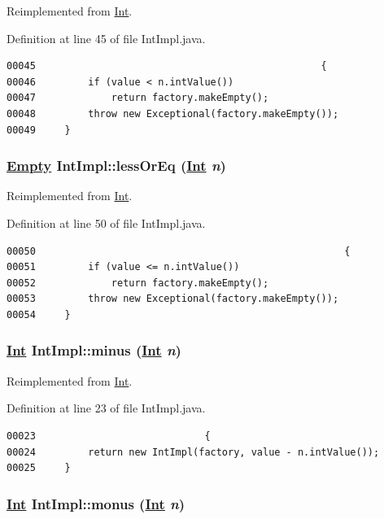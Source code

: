 Reimplemented from \hyperlink{interfaceInt_a7}{Int}.

Definition at line 45 of file Int\-Impl.java.\footnotesize\begin{verbatim}00045                                                 {
00046         if (value < n.intValue())
00047             return factory.makeEmpty();
00048         throw new Exceptional(factory.makeEmpty());
00049     }
\end{verbatim}\normalsize 
\hypertarget{classIntImpl_a8}{
\subsubsection[lessOrEq]{\setlength{\rightskip}{0pt plus 5cm}\hyperlink{interfaceEmpty}{Empty} Int\-Impl::less\-Or\-Eq (\hyperlink{interfaceInt}{Int} {\em n})}}
\label{classIntImpl_a8}




Reimplemented from \hyperlink{interfaceInt_a8}{Int}.

Definition at line 50 of file Int\-Impl.java.\footnotesize\begin{verbatim}00050                                                     {
00051         if (value <= n.intValue())
00052             return factory.makeEmpty();
00053         throw new Exceptional(factory.makeEmpty());
00054     }
\end{verbatim}\normalsize 
\hypertarget{classIntImpl_a2}{
\subsubsection[minus]{\setlength{\rightskip}{0pt plus 5cm}\hyperlink{interfaceInt}{Int} Int\-Impl::minus (\hyperlink{interfaceInt}{Int} {\em n})}}
\label{classIntImpl_a2}




Reimplemented from \hyperlink{interfaceInt_a2}{Int}.

Definition at line 23 of file Int\-Impl.java.\footnotesize\begin{verbatim}00023                             {
00024         return new IntImpl(factory, value - n.intValue());
00025     }
\end{verbatim}\normalsize 
\hypertarget{classIntImpl_a3}{
\subsubsection[monus]{\setlength{\rightskip}{0pt plus 5cm}\hyperlink{interfaceInt}{Int} Int\-Impl::monus (\hyperlink{interfaceInt}{Int} {\em n})}}
\label{classIntImpl_a3}




